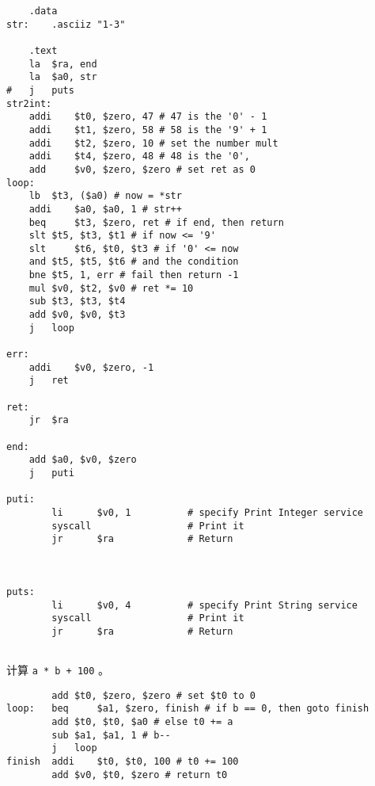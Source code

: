 \documentclass[lang=cn,11pt,a4paper,cite=authoryear]{elegantpaper}
\begin{document}
\begin{lstlisting}
	.data
str: 	.asciiz	"1-3"

	.text
	la	$ra, end
	la	$a0, str
#	j 	puts
str2int:
	addi	$t0, $zero, 47 # 47 is the '0' - 1
	addi 	$t1, $zero, 58 # 58 is the '9' + 1
	addi 	$t2, $zero, 10 # set the number mult
	addi	$t4, $zero, 48 # 48 is the '0', 
	add 	$v0, $zero, $zero # set ret as 0
loop:
	lb	$t3, ($a0) # now = *str
	addi	$a0, $a0, 1 # str++
	beq 	$t3, $zero, ret # if end, then return 
	slt	$t5, $t3, $t1 # if now <= '9'
	slt 	$t6, $t0, $t3 # if '0' <= now
	and	$t5, $t5, $t6 # and the condition
	bne	$t5, 1, err # fail then return -1
	mul	$v0, $t2, $v0 # ret *= 10
	sub	$t3, $t3, $t4
	add	$v0, $v0, $t3
	j	loop
	
err:
	addi	$v0, $zero, -1
	j	ret

ret:	
	jr 	$ra
	
end: 	
	add	$a0, $v0, $zero
	j 	puti
	
puti:
        li      $v0, 1          # specify Print Integer service
        syscall                 # Print it
        jr      $ra             # Return



puts:
        li      $v0, 4          # specify Print String service
        syscall                 # Print it
        jr      $ra             # Return


\end{lstlisting}


计算 \lstinline{a * b + 100} 。

\begin{lstlisting}
		add	$t0, $zero, $zero # set $t0 to 0
loop:	beq 	$a1, $zero, finish # if b == 0, then goto finish 
		add	$t0, $t0, $a0 # else t0 += a
		sub	$a1, $a1, 1 # b--
		j 	loop
finish	addi	$t0, $t0, 100 # t0 += 100
		add	$v0, $t0, $zero # return t0
\end{lstlisting}
\end{document}
